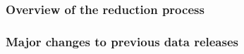 \documentclass[
  journal=pasa,
  manuscript=research-paper, %
  year=2023,
  volume=37
]{cup-journal}
\begin{document}
\subsubsection{Overview of the reduction process}


\subsubsection{Major changes to previous data releases} \label{sec:major_changes_to_previous_data_releases}





\end{document}
